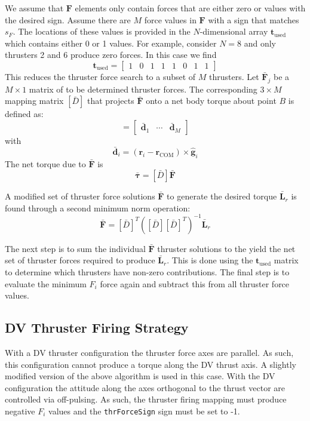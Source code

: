 We assume that $\bm F$ elements only contain forces that are either zero or values with the desired sign.   Assume there are $M$  force values in $\bm F$ with a sign that matches $s_{F}$.  The locations of these values is provided in the $N$-dimensional array $\bm t_{\text{used}}$ which contains either 0 or 1 values.  For example, consider $N=8$ and only thrusters 2 and 6 produce  zero forces. In this case we find
\begin{equation}
	\bm t_{\text{used}} = \begin{bmatrix}
		1 & 0 & 1 & 1 & 1 & 0 & 1 & 1
	\end{bmatrix}
\end{equation}
This reduces the thruster force search to a subset of $M$ thrusters.  Let $\bar{\bm F}_{j}$ be a $M\times 1$ matrix of to be determined thruster forces.  The corresponding $3\times M$ mapping matrix $[\bar D]$ that projects $\bar{\bm F}$ onto a net body torque about point $B$ is defined as:
\begin{equation}
	[\bar D] = \begin{bmatrix} \bar{\bm d}_{1} & \cdots & \bar{\bm d}_{M} \end{bmatrix}
\end{equation}
with
\begin{equation}
	\bar{\bm d}_{i} = (\bm r_{i} - \bm r_{\text{COM}}) \times \hat{\bm g}_{i}
\end{equation}
The net torque due to $\bar{\bm F}$ is 
\begin{equation}
	\bar{\bm \tau} = [\bar D] \bar{\bm F}
\end{equation}

A modified set of thruster force solutions $\bar{\bm F}$ to generate the desired torque $\bar{\bm L}_{r}$ is found through a second minimum norm operation:
\begin{equation}
	\label{eq:th:min2}
	\bar{\bm F} = [\bar D]^{T}([\bar D][\bar D]^{T})^{-1} \bar{\bm L}_{r}
\end{equation}




The next step is to sum the individual $\bar{\bm F}$ thruster solutions to the yield the net set of thruster forces required to produce $\bar{\bm L}_{r}$.  This is done using the  $\bm t_{\text{used}}$ matrix to determine which thrusters have non-zero contributions.   The final step is to evaluate the minimum $F_{i}$ force again and subtract this from all thruster force values.




\subsection{DV Thruster Firing Strategy}
With a DV thruster configuration the thruster force axes are parallel.  As such, this configuration cannot produce a torque along the DV thrust axis.  A slightly modified version of the above algorithm is used in this case.  With the DV configuration the attitude along the axes orthogonal to the thrust vector are controlled via off-pulsing.  As such, the thruster firing mapping must produce negative $F_{i}$ values and the {\tt thrForceSign} sign must be set to -1.  

